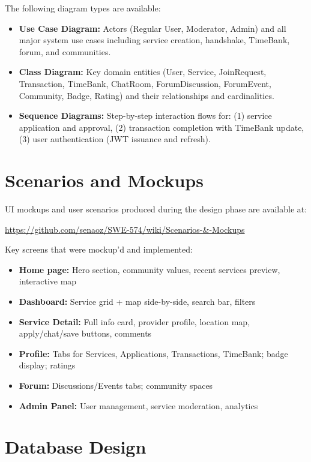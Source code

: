 \documentclass[10pt,a4paper]{report}
\begin{document}
The following diagram types are available:

\begin{itemize}
    \item \textbf{Use Case Diagram:} Actors (Regular User, Moderator, Admin) and all major system use cases including service creation, handshake, TimeBank, forum, and communities.
    \item \textbf{Class Diagram:} Key domain entities (User, Service, JoinRequest, Transaction, TimeBank, ChatRoom, ForumDiscussion, ForumEvent, Community, Badge, Rating) and their relationships and cardinalities.
    \item \textbf{Sequence Diagrams:} Step-by-step interaction flows for: (1) service application and approval, (2) transaction completion with TimeBank update, (3) user authentication (JWT issuance and refresh).
\end{itemize}

\section{Scenarios and Mockups}

UI mockups and user scenarios produced during the design phase are available at:
\begin{center}
    \url{https://github.com/senaoz/SWE-574/wiki/Scenarios-\&-Mockups}
\end{center}

Key screens that were mockup'd and implemented:
\begin{itemize}
    \item \textbf{Home page:} Hero section, community values, recent services preview, interactive map
    \item \textbf{Dashboard:} Service grid + map side-by-side, search bar, filters
    \item \textbf{Service Detail:} Full info card, provider profile, location map, apply/chat/save buttons, comments
    \item \textbf{Profile:} Tabs for Services, Applications, Transactions, TimeBank; badge display; ratings
    \item \textbf{Forum:} Discussions/Events tabs; community spaces
    \item \textbf{Admin Panel:} User management, service moderation, analytics
\end{itemize}

\section{Database Design}
\end{document}
